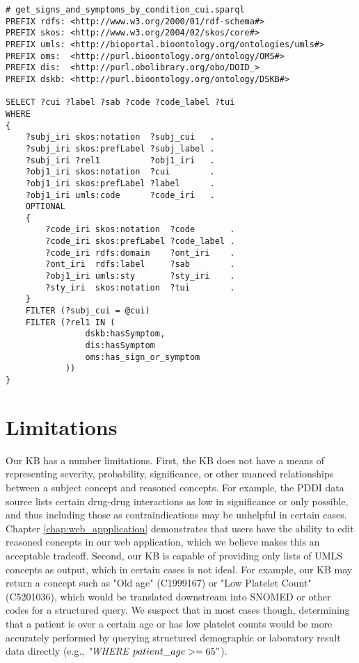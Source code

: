 \documentclass[../main.tex]{subfiles}
\begin{document}
\def\baselinestretch{1.0}    
\begin{lstlisting}
# get_signs_and_symptoms_by_condition_cui.sparql
PREFIX rdfs: <http://www.w3.org/2000/01/rdf-schema#>
PREFIX skos: <http://www.w3.org/2004/02/skos/core#>
PREFIX umls: <http://bioportal.bioontology.org/ontologies/umls#>
PREFIX oms:  <http://purl.bioontology.org/ontology/OMS#>
PREFIX dis:  <http://purl.obolibrary.org/obo/DOID_>
PREFIX dskb: <http://purl.bioontology.org/ontology/DSKB#>

SELECT ?cui ?label ?sab ?code ?code_label ?tui
WHERE 
{
    ?subj_iri skos:notation  ?subj_cui   .
    ?subj_iri skos:prefLabel ?subj_label .
    ?subj_iri ?rel1          ?obj1_iri   .
    ?obj1_iri skos:notation  ?cui        .
    ?obj1_iri skos:prefLabel ?label      .
    ?obj1_iri umls:code      ?code_iri   .
    OPTIONAL
    {
        ?code_iri skos:notation  ?code       .
        ?code_iri skos:prefLabel ?code_label .
        ?code_iri rdfs:domain    ?ont_iri    .
        ?ont_iri  rdfs:label     ?sab        .
        ?obj1_iri umls:sty       ?sty_iri    .
        ?sty_iri  skos:notation  ?tui        .
    }
    FILTER (?subj_cui = @cui) 
    FILTER (?rel1 IN (
                dskb:hasSymptom,
                dis:hasSymptom
                oms:has_sign_or_symptom
            ))
}
\end{lstlisting}
\def\baselinestretch{1.5}    

\section{Limitations}

Our KB has a number limitations. First, the KB does not have a means of representing severity, probability, significance, or other nuanced relationships between a subject concept and reasoned concepts. For example, the PDDI data source lists certain drug-drug interactions as low in significance or only possible, and thus including those as contraindications may be unhelpful in certain cases. Chapter \ref{chap:web_appplication} demonstrates that users have the ability to edit reasoned concepts in our web application, which we believe makes this an acceptable tradeoff. Second, our KB is capable of providing only lists of UMLS concepts as output, which in certain cases is not ideal. For example, our KB may return a concept such as "Old age" (C1999167) or "Low Platelet Count" (C5201036), which would be translated downstream into SNOMED or other codes for a structured query. We suspect that in most cases though, determining that a patient is over a certain age or has low platelet counts would be more accurately performed by querying structured demographic or laboratory result data directly (e.g., \textit{"WHERE} $patient\_age >= 65"$). 
\end{document}

